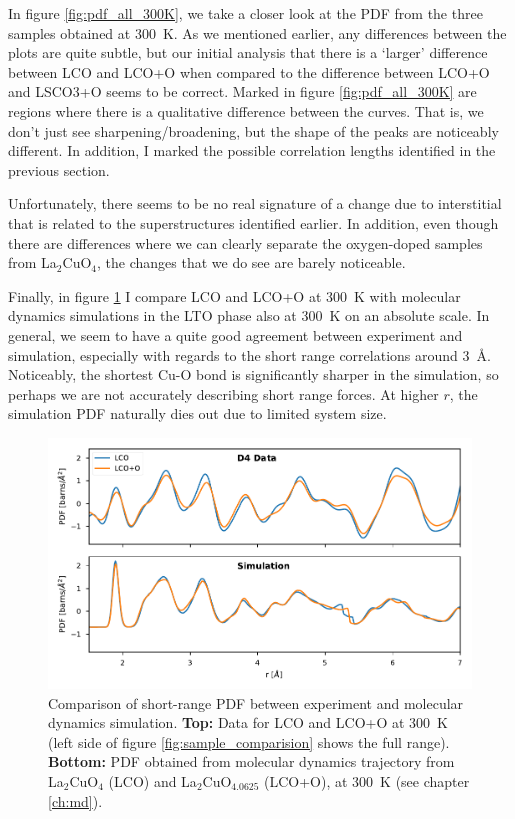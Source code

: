 In figure \ref{fig:pdf_all_300K}, we take a closer look at the PDF from the three samples obtained at \SI{300}{\kelvin}. As we mentioned earlier, any differences between the plots are quite subtle, but our initial analysis that there is a `larger' difference between LCO and LCO+O when compared to the difference between LCO+O and LSCO3+O seems to be correct. Marked in figure \ref{fig:pdf_all_300K} are regions where there is a qualitative difference between the curves. That is, we don't just see sharpening/broadening, but the shape of the peaks are noticeably different. In addition, I marked the possible correlation lengths identified in the previous section.

Unfortunately, there seems to be no real signature of a change due to interstitial that is related to the superstructures identified earlier. In addition, even though there are differences where we can clearly separate the oxygen-doped samples from La$_2$CuO$_4$, the changes that we do see are barely noticeable.

Finally, in figure \ref{fig:pdf_sim_comparision} I compare LCO and LCO+O at \SI{300}{\kelvin} with molecular dynamics simulations in the LTO phase also at \SI{300}{\kelvin} on an absolute scale. In general, we seem to have a quite good agreement between experiment and simulation, especially with regards to the short range correlations around \SI{3}{\angstrom}. Noticeably, the shortest Cu-O bond is significantly sharper in the simulation, so perhaps we are not accurately describing short range forces. At higher $r$, the simulation PDF naturally dies out due to limited system size.

\begin{figure}
    \centering
    \includegraphics[width=\textwidth]{fig/pdf/pdf_simulation_experiment_compare.pdf}
    \caption[PDF data compared with MD simulation]{Comparison of short-range PDF between experiment and molecular dynamics simulation. \textbf{Top:} Data for LCO and LCO+O at \SI{300}{\kelvin} (left side of figure \ref{fig:sample_comparision} shows the full range). \textbf{Bottom:} PDF obtained from molecular dynamics trajectory from La$_2$CuO$_4$ (LCO) and La$_2$CuO$_{4.0625}$ (LCO+O), at \SI{300}{\kelvin} (see chapter \ref{ch:md}).}
    \label{fig:pdf_sim_comparision}
\end{figure}

